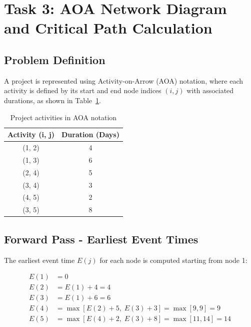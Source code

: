 \documentclass[12pt,a4paper]{article}
\begin{document}
\newpage
\section*{Task 3: AOA Network Diagram and Critical Path Calculation}

\subsection*{Problem Definition}

A project is represented using Activity-on-Arrow (AOA) notation, where each
activity is defined by its start and end node indices $(i, j)$ with
associated durations, as shown in Table~\ref{tab:aoa}.

\begin{table}[h!]
\centering
\renewcommand{\arraystretch}{1.25}
\begin{tabular}{|c|c|}
\hline
\textbf{Activity (i, j)} & \textbf{Duration (Days)} \\ \hline
(1, 2) & 4 \\ \hline
(1, 3) & 6 \\ \hline
(2, 4) & 5 \\ \hline
(3, 4) & 3 \\ \hline
(4, 5) & 2 \\ \hline
(3, 5) & 8 \\ \hline
\end{tabular}
\caption{Project activities in AOA notation}
\label{tab:aoa}
\end{table}

\subsection*{Forward Pass - Earliest Event Times}

The earliest event time $E(j)$ for each node is computed starting from node 1:

\[
\begin{aligned}
E(1) &= 0 \\
E(2) &= E(1) + 4 = 4 \\
E(3) &= E(1) + 6 = 6 \\
E(4) &= \max[E(2) + 5,\; E(3) + 3] = \max[9, 9] = 9 \\
E(5) &= \max[E(4) + 2,\; E(3) + 8] = \max[11, 14] = 14
\end{aligned}
\]
\end{document}
